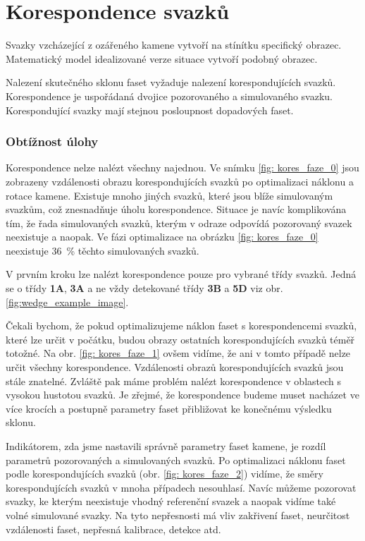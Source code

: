 \part{Korespondence svazků}

Svazky vzcházející z ozářeného kamene vytvoří na stínítku specifický obrazec. Matematický model idealizované verze situace vytvoří podobný obrazec. 

Nalezení skutečného sklonu faset vyžaduje nalezení korespondujících svazků. Korespondence je uspořádaná dvojice pozorovaného a simulovaného svazku. Korespondující svazky mají stejnou posloupnost dopadových faset.
\vspace{4mm}
\section{Obtížnost úlohy}
	Korespondence nelze nalézt všechny najednou. Ve snímku \ref{fig: kores_faze_0} jsou zobrazeny vzdálenosti obrazu korespondujících svazků po optimalizaci náklonu a rotace kamene.  Existuje mnoho jiných svazků, které jsou blíže simulovaným svazkům, což znesnadňuje úholu korespondence. Situace je navíc komplikována tím, že řada simulovaných svazků, kterým v odraze odpovídá pozorovaný svazek neexistuje a naopak. Ve fázi optimalizace na obrázku \ref{fig: kores_faze_0} neexistuje \SI{36}{\percent} těchto simulovaných svazků. 
	
	  V prvním kroku lze nalézt korespondence pouze pro vybrané třídy svazků. Jedná se o třídy \textbf{1A}, \textbf{3A} a ne vždy detekované třídy \textbf{3B} a \textbf{5D} viz obr. \ref{fig:wedge_example_image}. 
	
	Čekali bychom, že pokud optimalizujeme náklon faset s korespondencemi svazků, které lze určit v počátku, budou obrazy ostatních korespondujících svazků téměř totožné. Na obr. \ref{fig: kores_faze_1} ovšem vidíme, že ani v tomto případě nelze určit všechny korespondence. Vzdálenosti obrazů korespondujících svazků jsou stále znatelné. Zvláště pak máme problém nalézt korespondence v oblastech s vysokou hustotou svazků. Je zřejmé, že korespondence budeme muset nacházet ve více krocích a postupně parametry faset přibližovat ke konečnému výsledku sklonu. 

Indikátorem, zda jsme nastavili správně parametry faset kamene, je rozdíl parametrů pozorovaných a simulovaných svazků. Po optimalizaci náklonu faset podle korespondujících svazků (obr. \ref{fig: kores_faze_2}) vidíme, že směry korespondujících svazků v mnoha případech nesouhlasí. Navíc můžeme pozorovat svazky, ke kterým neexistuje vhodný referenční svazek a naopak vidíme také volné simulované svazky. Na tyto nepřesnosti má vliv zakřivení faset, neurčitost vzdálenosti faset, nepřesná kalibrace, detekce atd.  

